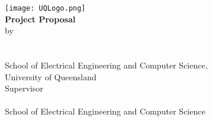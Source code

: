 \begin{titlepage}
	\begin{center}
		\texttt{[image: UQLogo.png]}\\
        \vfill
		\huge \textbf{Project Proposal}\\
        \huge \covertext
        \vfill
		\large by\\
		\vspace{5mm}
		\Large \authortext \\
        \large \studentnotext \\
        \large {}
        \vfill
		\large School of Electrical Engineering and Computer Science,\\\smallskip
        \large University of Queensland\\
        \vfill
        \small Supervisor \\
        \vspace{1mm}
        \large \supervisornametext \\
        \small School of Electrical Engineering and Computer Science \\
        \small {} \\
        \vfill
		\large \proposalduedate
	\end{center}
\end{titlepage}

\thispagestyle{empty}
\newpage
\setcounter{page}{1}